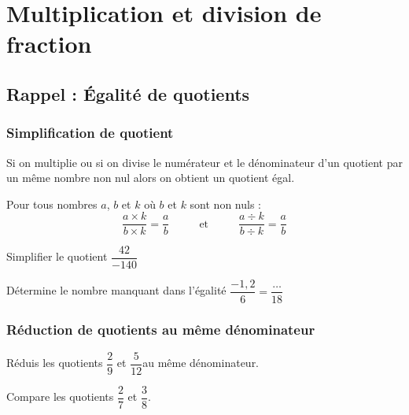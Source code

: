 \documentclass[a4paper,10pt]{report}
\begin{document}
\newpage
\setcounter{chapter}{13}
\chapter{Multiplication et division de fraction}

\section{Rappel : Égalité de quotients}

\subsection{Simplification de quotient}

\begin{memento}
Si on multiplie ou si on divise le numérateur et le dénominateur d'un quotient par un même nombre non nul alors on obtient un quotient égal.

\medskip
\noindent Pour tous nombres $a$, $b$ et $k$ où $b$ et $k$ sont non nuls :
$$\dfrac{a \times k}{b \times k} = \dfrac{a}{b} \hspace{1cm} \text{ et } \hspace{1cm} \dfrac{a \div k}{b \div k} = \dfrac{a}{b}$$
\end{memento}

\begin{ex}
Simplifier le quotient $\dfrac{42}{-140}$

\noindent\grandscarreaux{\linewidth}{3.2cm}
\end{ex}

\begin{ex}
Détermine le nombre manquant dans l'égalité $\dfrac{-1,2}{6}=\dfrac{\dots}{18}$

\noindent\grandscarreaux{\linewidth}{3.2cm}
\end{ex}

\subsection{Réduction de quotients au même dénominateur}

\begin{ex}
Réduis les quotients $\dfrac{2}{9}$ et $\dfrac{5}{12}$au même dénominateur.

\noindent\grandscarreaux{\linewidth}{3.2cm}
\end{ex}

\begin{ex}
Compare les quotients $\dfrac{2}{7}$ et $\dfrac{3}{8}$.

\noindent\grandscarreaux{\linewidth}{3.2cm}
\end{ex}
\end{document}
